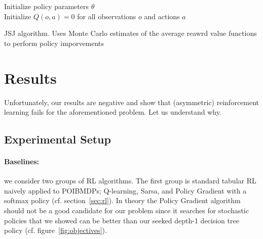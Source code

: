 \begin{algorithm}
    Initialize policy parameters $\theta$ \\
    Initialize $Q(o, a) = 0$ for all observations $o$ and actions $a$ \\
    \caption{JSJ algorithm. Uses Monte Carlo estimates of the average reawrd value functions to perform policy imporvements}\label{alg:jsj}
\end{algorithm}

\section{Results}

Unfortunately, our results are negative and show that (asymmetric) reinforcement learning fails for the aforementioned problem. Let us understand why.

\subsection{Experimental Setup}

\paragraph{Baselines:} we consider two groups of RL algorithms.
The first group is standard tabular RL naively applied to POIBMDPs; Q-learning, Sarsa, and Policy Gradient with a softmax policy (cf. section~\ref{sec:rl}).
In theory the Policy Gradient algorithm should not be a good candidate for our problem since it searches for stochastic policies that we showed can be better than our seeked depth-1 decision tree policy (cf. figure~\ref{fig:objectives}).

